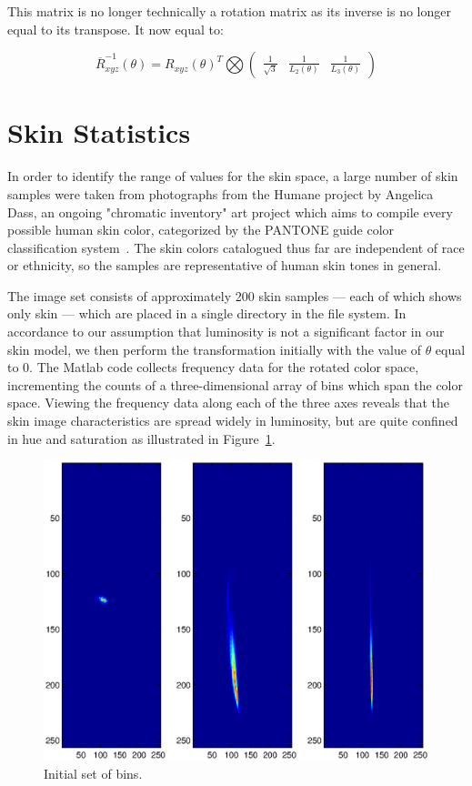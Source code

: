 This matrix is no longer technically a rotation matrix as its inverse is no longer equal to its transpose. It now equal to:

\begin{equation}\label{eq:NormRxyz3Inverse}
 \overline{R}_{xyz}^{-1}(\theta) =
 R_{xyz}(\theta)^{T} \bigotimes
\left(
\begin{array}{ccc}
 \frac{1}{\sqrt{3}}  &
 \frac{1}{L_2(\theta)} &
 \frac{1}{L_3(\theta) }
\end{array}
\right)
\end{equation}

\section{Skin Statistics}\label{sec:SkinStatistics}

In order to identify the range of values for the skin space, a large number of skin samples were taken from photographs from the Humane project by Angelica Dass, an ongoing "chromatic inventory" art project which aims to compile every possible human skin color, categorized by the PANTONE guide color classification system~\cite{Dass2012}. The skin colors catalogued thus far are independent of race or ethnicity, so the samples are representative of human skin tones in general.

The image set consists of approximately 200 skin samples --- each of which shows only skin --- which are placed in a single directory in the file system. In accordance to our assumption that luminosity is not a significant factor in our skin model, we then perform the transformation initially with the value of $\theta$ equal to 0. The Matlab code collects frequency data for the rotated color space, incrementing the counts of a three-dimensional array of bins which span the color space. Viewing the frequency data along each of the three axes reveals that the skin image characteristics are spread widely in luminosity, but are quite confined in hue and saturation as illustrated in Figure~\ref{fig:InitBins}.


\begin{figure}[h!]
  \centering
    \includegraphics[width=\textwidth]{Chapter2/Figs/InitialBins.eps}
    \caption{Initial set of bins.}  \label{fig:InitBins}
\end{figure}


